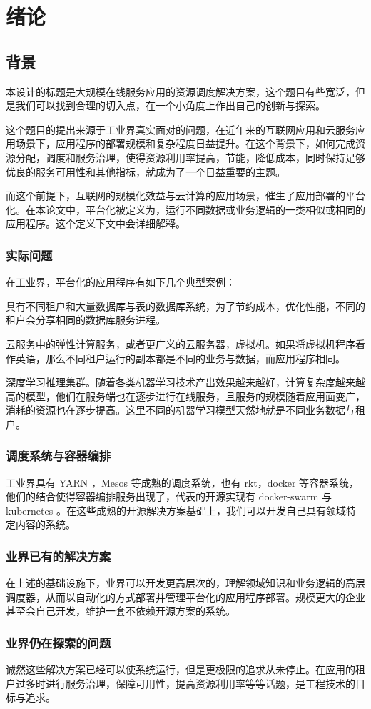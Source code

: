 
\section{绪论}

\subsection{背景}

本设计的标题是大规模在线服务应用的资源调度解决方案，这个题目有些宽泛，但是我们可以找到合理的切入点，在一个小角度上作出自己的创新与探索。

这个题目的提出来源于工业界真实面对的问题，在近年来的互联网应用和云服务应用场景下，应用程序的部署规模和复杂程度日益提升。在这个背景下，如何完成资源分配，调度和服务治理，使得资源利用率提高，节能，降低成本，同时保持足够优良的服务可用性和其他指标，就成为了一个日益重要的主题。

而这个前提下，互联网的规模化效益与云计算的应用场景，催生了应用部署的平台化。在本论文中，平台化被定义为，运行不同数据或业务逻辑的一类相似或相同的应用程序。这个定义下文中会详细解释。

\subsubsection{实际问题}

在工业界，平台化的应用程序有如下几个典型案例：

具有不同租户和大量数据库与表的数据库系统，为了节约成本，优化性能，不同的租户会分享相同的数据库服务进程。

云服务中的弹性计算服务，或者更广义的云服务器，虚拟机。如果将虚拟机程序看作英语，那么不同租户运行的副本都是不同的业务与数据，而应用程序相同。

深度学习推理集群。随着各类机器学习技术产出效果越来越好，计算复杂度越来越高的模型，他们在服务端也在逐步进行在线服务，且服务的规模随着应用面变广，消耗的资源也在逐步提高。这里不同的机器学习模型天然地就是不同业务数据与租户。

\subsubsection{调度系统与容器编排}

工业界具有 YARN \cite{hadoop} ，Mesos 等成熟的调度系统，也有 rkt，docker 等容器系统，他们的结合使得容器编排服务出现了，代表的开源实现有 docker-swarm 与 kubernetes \cite{kubernetes} 。在这些成熟的开源解决方案基础上，我们可以开发自己具有领域特定内容的系统。

\subsubsection{业界已有的解决方案}

在上述的基础设施下，业界可以开发更高层次的，理解领域知识和业务逻辑的高层调度器，从而以自动化的方式部署并管理平台化的应用程序部署。规模更大的企业甚至会自己开发，维护一套不依赖开源方案的系统。

\subsubsection{业界仍在探索的问题}

诚然这些解决方案已经可以使系统运行，但是更极限的追求从未停止。在应用的租户过多时进行服务治理，保障可用性，提高资源利用率等等话题，是工程技术的目标与追求。
